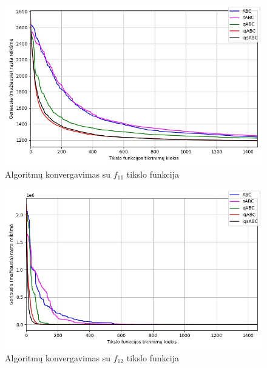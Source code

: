 \documentclass{VUMIFKompMagistrinis}
\begin{document}
\begin{landscape}
\begin{multicols}{2}
\begin{figure}[H]
    \centering
    \includegraphics[scale=0.45]{img/2kv/all_f11.jpg}
    \caption{Algoritmų konvergavimas su $f_{11}$ tikslo funkcija}
    \label{img:konf11}
\end{figure}



\begin{figure}[H]
    \centering
    \includegraphics[scale=0.45]{img/2kv/all_f12.jpg}
    \caption{Algoritmų konvergavimas su $f_{12}$ tikslo funkcija}
    \label{img:konf12}
\end{figure}






\end{multicols}
\begin{multicols}{2}



\end{multicols}
\end{landscape}
\end{document}
